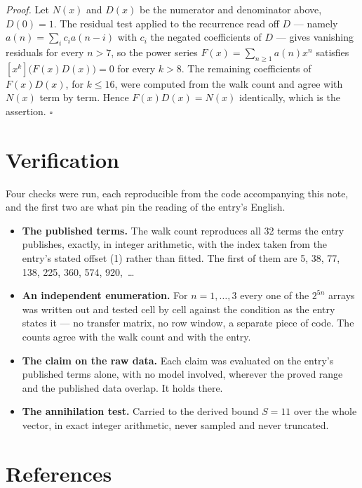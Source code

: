 \documentclass[11pt]{article}
\theoremstyle{definition}
\begin{document}
{\itshape Proof.} Let $N(x)$ and $D(x)$ be the numerator and denominator above, $D(0)=1$. The residual test applied to the recurrence read off $D$ --- namely $a(n) = \sum_i c_i a(n-i)$ with $c_i$ the negated coefficients of $D$ --- gives vanishing residuals for every $n > 7$, so the power series $F(x)=\sum_{n\ge 1}a(n)x^n$ satisfies $[x^k]\bigl(F(x)D(x)\bigr) = 0$ for every $k > 8$. The remaining coefficients of $F(x)D(x)$, for $k \le 16$, were computed from the walk count and agree with $N(x)$ term by term. Hence $F(x)D(x) = N(x)$ identically, which is the assertion. $\square$

\section{Verification}

Four checks were run, each reproducible from the code accompanying this note, and the first two are what pin the reading of the entry's English.

\begin{itemize}

\item {\bfseries The published terms.} The walk count reproduces all 32 terms the entry publishes, exactly, in integer arithmetic, with the index taken from the entry's stated offset (1) rather than fitted. The first of them are 5, 38, 77, 138, 225, 360, 574, 920,~\dots

\item {\bfseries An independent enumeration.} For $n = 1,\dots,3$ every one of the $2^{5n}$ arrays was written out and tested cell by cell against the condition as the entry states it --- no transfer matrix, no row window, a separate piece of code. The counts agree with the walk count and with the entry.

\item {\bfseries The claim on the raw data.} Each claim was evaluated on the entry's published terms alone, with no model involved, wherever the proved range and the published data overlap. It holds there.

\item {\bfseries The annihilation test.} Carried to the derived bound $S = 11$ over the whole vector, in exact integer arithmetic, never sampled and never truncated.

\end{itemize}

\section{References}
\end{document}
